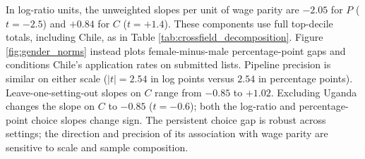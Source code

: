 In log-ratio units, the unweighted slopes per unit of wage parity are $-2.05$ for $P$ ($t=-2.5$) and $+0.84$ for $C$ ($t=+1.4$). These components use full top-decile totals, including Chile, as in Table \ref{tab:crossfield_decomposition}. Figure \ref{fig:gender_norms} instead plots female-minus-male percentage-point gaps and conditions Chile's application rates on submitted lists. Pipeline precision is similar on either scale ($|t|=2.54$ in log points versus $2.54$ in percentage points). Leave-one-setting-out slopes on $C$ range from $-0.85$ to $+1.02$. Excluding Uganda changes the slope on $C$ to $-0.85$ ($t=-0.6$); both the log-ratio and percentage-point choice slopes change sign. The persistent choice gap is robust across settings; the direction and precision of its association with wage parity are sensitive to scale and sample composition.
